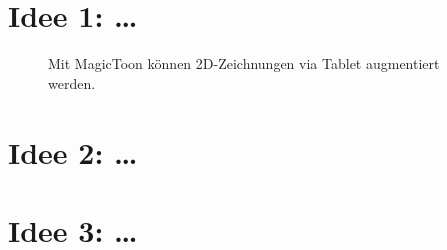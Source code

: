 \documentclass[a4paper]{scrartcl}
\begin{document}
\section*{Idee 1: \dots}

\lipsum[1-2]

\begin{figure}[h]
	\centering
	\caption{Mit MagicToon \parencite{???} können 2D-Zeichnungen via Tablet augmentiert werden.}
\end{figure}


\section*{Idee 2: \dots}

\lipsum[3-4]

\section*{Idee 3: \dots}

\lipsum[5-6]

\printbibliography[nottype=online]
\printbibliography[title={Online Referenzen}, type=online]
\end{document}
